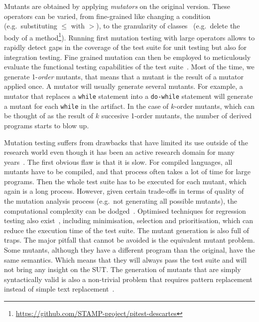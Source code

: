 \documentclass[a4paper,11pt]{sdm_internship}
\newcommand{\addref}[1]{\colorbox{TealBlue!100}{\textcolor{white}{\textbf{$[$\ifx&#1&\ \else#1\fi$]$}}}}
\newcommand{\todo}[1]{\colorbox{Red!75}{\textcolor{white}{\textbf{TODO\ifx&#1&\else: #1\fi}}}}
\theoremstyle{definition}
\begin{document}


Mutants are obtained by applying \emph{mutators} on the original version.
These operators can be varied, from fine-grained like changing a condition (e.g.\ substituting $\leq$ with $>$), to the granularity of classes~\cite{segura2011mutation} (e.g.\ delete the body of a method\footnote{\url{https://github.com/STAMP-project/pitest-descartes}}).
Running first mutation testing with large operators allows to rapidly detect gaps in the coverage of the test suite for unit testing but also for integration testing.
Fine grained mutation can then be employed to meticulously evaluate the functional testing capabilities of the test suite~\cite{howden1982weak}.
Most of the time, we generate 1-\emph{order} mutants, that means that a mutant is the result of a mutator applied once.
A mutator will usually generate several mutants.
For example, a mutator that replaces a \texttt{while} statement into a \texttt{do-while} statement will generate a mutant for each \texttt{while} in the artifact.
In the case of $k$-order mutants, which can be thought of as the result of $k$ succesive 1-order mutants\cite{wah2000theoretical}, the number of derived programs starts to blow up.

Mutation testing suffers from drawbacks that have limited its use outside of the research world even though it has been an active research domain for many years~\cite{jia2011analysis}.
The first obvious flaw is that it is slow.
For compiled languages, all mutants have to be compiled, and that process often takes a lot of time for large programs.
Then the whole test suite has to be executed for each mutant, which again is a long process.
However, given certain trade-offs in terms of quality of the mutation analysis process (e.g.\ not generating all possible mutants), the computational complexity can be dodged~\cite{offutt1993experimental,movzucha2016mutation}.
Optimised techniques for regression testing also exist~\cite{yoo2012regression}, including minimisation, selection and prioritisation, which can reduce the execution time of the test suite.
The mutant generation is also full of traps.
The major pitfall that cannot be avoided is the equivalent mutant problem.
Some mutants, although they have a different program than the original, have the same semantics.
Which means that they will always pass the test suite and will not bring any insight on the SUT\@.
The generation of mutants that are simply syntactically valid is also a non-trivial problem that requires pattern replacement instead of simple text replacement~\cite{simao2009transformational}.
\end{document}
